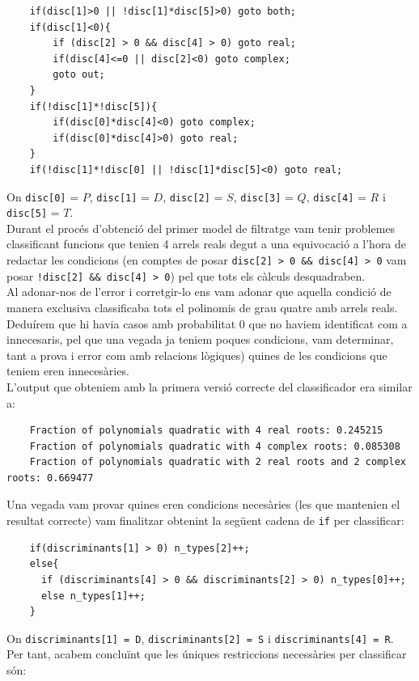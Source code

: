 \documentclass[a4paper, 11pt]{article}
\begin{document}
\small\begin{verbatim}
    if(disc[1]>0 || !disc[1]*disc[5]>0) goto both;
    if(disc[1]<0){
        if (disc[2] > 0 && disc[4] > 0) goto real;
        if(disc[4]<=0 || disc[2]<0) goto complex;
        goto out;
    }
    if(!disc[1]*!disc[5]){
        if(disc[0]*disc[4]<0) goto complex;
        if(disc[0]*disc[4]>0) goto real;
    }
    if(!disc[1]*!disc[0] || !disc[1]*disc[5]<0) goto real;
\end{verbatim}
On \texttt{disc[0]} = $P$, \texttt{disc[1]} = $D$, \texttt{disc[2]} = $S$, \texttt{disc[3]} = $Q$, \texttt{disc[4]} = $R$ i \texttt{disc[5]} = $T$.
\\
Durant el procés d'obtenció del primer model de filtratge vam tenir problemes classificant funcions que tenien 4 arrels reals degut a una equivocació a l'hora de redactar les condicions (en comptes de posar \texttt{disc[2] > 0 \&\& disc[4] > 0} vam posar \texttt{!disc[2] \&\& disc[4] > 0}) pel que tots els càlculs desquadraben.\\
Al adonar-nos de l'error i corretgir-lo ens vam adonar que aquella condició de manera exclusiva classificaba tots el polinomis de grau quatre amb arrels reals.\\
Deduírem que hi havia casos amb probabilitat 0 que no haviem identificat com a innecesaris, pel que una vegada ja teniem poques condicions, vam determinar, tant a prova i error com amb relacions lògiques) quines de les condicions que teniem eren innecesàries.\\
L'output que obteniem amb la primera versió correcte del classificador era similar a:
\begin{verbatim}
    Fraction of polynomials quadratic with 4 real roots: 0.245215
    Fraction of polynomials quadratic with 4 complex roots: 0.085308 
    Fraction of polynomials quadratic with 2 real roots and 2 complex roots: 0.669477 
\end{verbatim}
Una vegada vam provar quines eren condicions necesàries (les que mantenien el resultat correcte) vam finalitzar obtenint la següent cadena de \texttt{if} per classificar:
\begin{verbatim}
    if(discriminants[1] > 0) n_types[2]++;
    else{
      if (discriminants[4] > 0 && discriminants[2] > 0) n_types[0]++;
      else n_types[1]++;
    }
\end{verbatim}
On \texttt{discriminants[1] = D}, \texttt{discriminants[2] = S} i \texttt{discriminants[4] = R}.\\
Per tant, acabem concluïnt que les úniques restriccions necessàries per classificar són:
\end{document}
